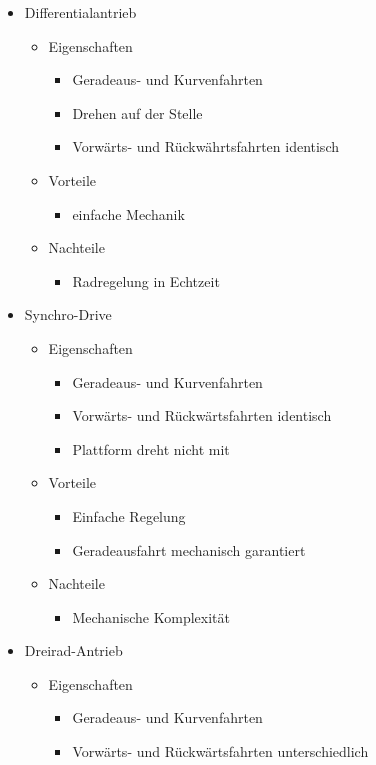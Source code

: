 \documentclass[paper=a4, fontsize=11pt]{scrartcl} %
\numberwithin{equation}{section} %
\numberwithin{figure}{section} %
\numberwithin{table}{section} %
\begin{document}
\begin{itemize}
\item Differentialantrieb
\begin{itemize}
\item Eigenschaften
\begin{itemize}
\item Geradeaus- und Kurvenfahrten
\item Drehen auf der Stelle
\item Vorwärts- und Rückwährtsfahrten identisch
\end{itemize}
\item Vorteile
\begin{itemize}
\item einfache Mechanik
\end{itemize}
\item Nachteile
\begin{itemize}
\item Radregelung in Echtzeit
\end{itemize}
\end{itemize}
\item Synchro-Drive
\begin{itemize}
\item Eigenschaften
\begin{itemize}
\item Geradeaus- und Kurvenfahrten
\item Vorwärts- und Rückwärtsfahrten identisch
\item Plattform dreht nicht mit
\end{itemize}
\item Vorteile
\begin{itemize}
\item Einfache Regelung
\item Geradeausfahrt mechanisch garantiert
\end{itemize}
\item Nachteile
\begin{itemize}
\item Mechanische Komplexität
\end{itemize}
\end{itemize}
\item Dreirad-Antrieb
\begin{itemize}
\item Eigenschaften
\begin{itemize}
\item Geradeaus- und Kurvenfahrten
\item Vorwärts- und Rückwärtsfahrten unterschiedlich

\end{itemize}
\end{itemize}
\end{itemize}
\end{document}
